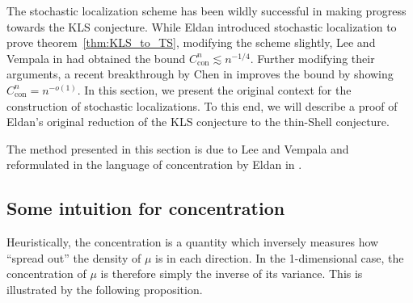 The stochastic localization scheme has been wildly successful in making progress towards the KLS conjecture. 
While Eldan introduced stochastic localization to prove theorem~\ref{thm:KLS_to_TS}, 
modifying the scheme slightly, Lee and Vempala in \cite{Lee_2016} had obtained the bound 
\(C_{\text{con}}^n \lesssim n^{-1 / 4}\). Further modifying their arguments, a recent breakthrough by 
Chen in \cite{Chen_2020} improves the bound by showing \(C_{\text{con}}^n = n^{-o(1)}\).
In this section, we present the original context for the construction of stochastic 
localizations. To this end, we will describe a proof of Eldan's original reduction of the KLS 
conjecture to the thin-Shell conjecture.

The method presented in this section is due to Lee and Vempala \cite{Lee_2016} and reformulated in 
the language of concentration by Eldan in \cite{Eldan_notes}.


\subsection{Some intuition for concentration}



Heuristically, the concentration is a quantity which inversely measures how ``spread out'' the density 
of \(\mu\) is in each direction. In the 1-dimensional case, the concentration of \(\mu\) is therefore 
simply the inverse of its variance. This is illustrated by the following proposition. 

